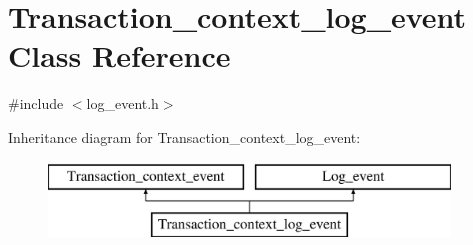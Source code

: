 \hypertarget{classTransaction__context__log__event}{}\section{Transaction\+\_\+context\+\_\+log\+\_\+event Class Reference}
\label{classTransaction__context__log__event}


{\ttfamily \#include $<$log\+\_\+event.\+h$>$}

Inheritance diagram for Transaction\+\_\+context\+\_\+log\+\_\+event\+:\begin{figure}[H]
\begin{center}
\leavevmode
\includegraphics[height=2.000000cm]{classTransaction__context__log__event}
\end{center}
\end{figure}
